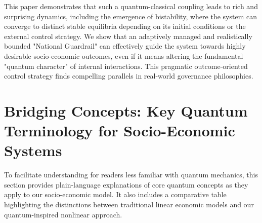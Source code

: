 \documentclass[9pt]{article}
\begin{document}
This paper demonstrates that such a quantum-classical coupling leads to rich and surprising dynamics, including the emergence of bistability, where the system can converge to distinct stable equilibria depending on its initial conditions or the external control strategy. We show that an adaptively managed and realistically bounded "National Guardrail" can effectively guide the system towards highly desirable socio-economic outcomes, even if it means altering the fundamental "quantum character" of internal interactions. This pragmatic outcome-oriented control strategy finds compelling parallels in real-world governance philosophies.

\section{Bridging Concepts: Key Quantum Terminology for Socio-Economic Systems}
To facilitate understanding for readers less familiar with quantum mechanics, this section provides plain-language explanations of core quantum concepts as they apply to our socio-economic model. It also includes a comparative table highlighting the distinctions between traditional linear economic models and our quantum-inspired nonlinear approach.
\end{document}
